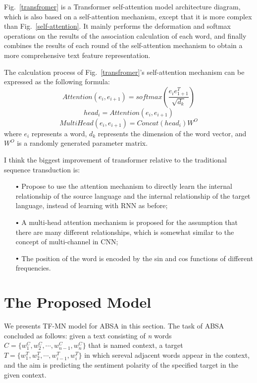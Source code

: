 \documentclass{ieeeaccess}
\begin{document}
Fig.~\ref{transfromer} is a Transformer self-attention model architecture diagram, which is also based on a self-attention mechanism, except that it is more complex than Fig.~\ref{self-attention}. It mainly performs the deformation and softmax operations on the results of the association calculation of each word, and finally combines the results of each round of the self-attention mechanism to obtain a more comprehensive text feature representation.

The calculation process of Fig.~\ref{transfromer}'s self-attention mechanism can be expressed as the following formula:
\begin{equation}Attention(e_i, e_{i+1})=softmax(\dfrac{e_i e_{1+1}^T}{\sqrt{d_k}})\end{equation}
\begin{equation}head_i=Attention(e_i, e_{i+1})\end{equation}
\begin{equation}MultiHead(e_i, e_{i+1})=Concat(head_i)W^O\end{equation}
where $e_i$ represents a word, $d_k$ represents the dimension of the word vector, and $W^O$ is a randomly generated parameter matrix.

I think the biggest improvement of transformer relative to the traditional sequence transduction is:

\begin{itemize}
	\item[$\vcenter{\hbox{\tiny$\bullet$}}$] Propose to use the attention mechanism to directly learn the internal relationship of the source language and the internal relationship of the target language, instead of learning with RNN as before;
	\item[$\vcenter{\hbox{\tiny$\bullet$}}$] A multi-head attention mechanism is proposed for the assumption that there are many different relationships, which is somewhat similar to the concept of multi-channel in CNN;
	\item[$\vcenter{\hbox{\tiny$\bullet$}}$] The position of the word is encoded by the sin and cos functions of different frequencies.
\end{itemize}

\section{The Proposed Model}
We presents TF-MN model for ABSA in this section. The task of ABSA concluded as follows: given a text consisting of \emph{n} words $C = \{w_1^C, w_2^C, \cdots, w_{n-1}^C, w_n^C\}$ that is named context, a target $T = \{w_1^T, w_2^T, \cdots, w_{i-1}^T, w_i^T\}$ in which sereval adjacent words appear in the context, and the aim is predicting the sentiment polarity of the specified target in the given context.
\end{document}
